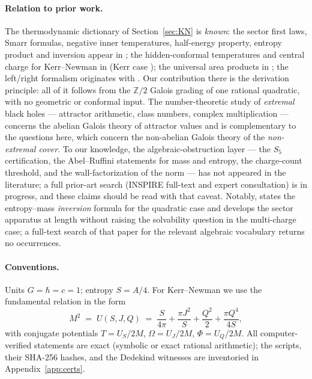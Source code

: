 \documentclass[11pt]{article}
\theoremstyle{definition}
\theoremstyle{remark}
\newcommand{\ZZ}{\mathbb{Z}}
\begin{document}
\paragraph{Relation to prior work.} The thermodynamic dictionary of
Section~\ref{sec:KN} is \emph{known}: the sector first laws, Smarr formulas,
negative inner temperatures, half-energy property, entropy product and
inversion appear in \cite{CGLP2018}; the hidden-conformal temperatures and
central charge for Kerr--Newman in \cite{WangLiu} (Kerr case \cite{CMS});
the universal area products in \cite{AH,CGP2011,CR2012}; the left/right
formalism originates with \cite{CL1,CL2}. Our contribution there is the
derivation principle: all of it follows from the $\ZZ/2$ Galois grading of one
rational quadratic, with no geometric or conformal input. The
number-theoretic study of \emph{extremal} black holes --- attractor arithmetic,
class numbers, complex multiplication \cite{Moore,BKO} --- concerns the
abelian Galois theory of attractor values and is complementary to the
questions here, which concern the non-abelian Galois theory of the
\emph{non-extremal cover}. To our knowledge, the algebraic-obstruction layer
--- the $S_5$ certification, the Abel--Ruffini statements for mass and entropy,
the charge-count threshold, and the wall-factorization of the norm --- has not
appeared in the literature; a full prior-art search (INSPIRE full-text and
expert consultation) is in progress, and these claims should be read with that
caveat. Notably, \cite{CGLP2018} states the entropy--mass \emph{inversion}
formula for the quadratic case and develops the sector apparatus at length
without raising the solvability question in the multi-charge case; a full-text
search of that paper for the relevant algebraic vocabulary returns no
occurrences.

\paragraph{Conventions.} Units $G=\hbar=c=1$; entropy $S=A/4$. For
Kerr--Newman we use the fundamental relation in the form
\begin{equation}
M^2 \;=\; U(S,J,Q)\;=\;\frac{S}{4\pi}+\frac{\pi J^2}{S}+\frac{Q^2}{2}
+\frac{\pi Q^4}{4S},
\label{eq:U}
\end{equation}
with conjugate potentials $T=U_S/2M$, $\Omega=U_J/2M$, $\Phi=U_Q/2M$.
All computer-verified statements are exact (symbolic or exact rational
arithmetic); the scripts, their SHA-256 hashes, and the Dedekind witnesses are
inventoried in Appendix~\ref{app:certs}.
\end{document}

